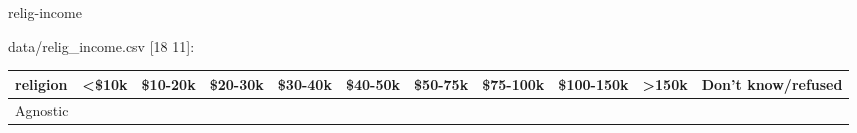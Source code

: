 \documentclass[]{article}
\newenvironment{Shaded}{\begin{snugshade}}{\end{snugshade}}
\newcommand{\NormalTok}[1]{#1}
\begin{document}
\begin{Shaded}
\begin{Highlighting}[]
\NormalTok{relig-income}
\end{Highlighting}
\end{Shaded}

data/relig\_income.csv {[}18 11{]}:

\begin{longtable}[]{@{}lllllllllll@{}}
\toprule
\begin{minipage}[b]{0.14\columnwidth}\raggedright\strut
religion\strut
\end{minipage} & \begin{minipage}[b]{0.04\columnwidth}\raggedright\strut
\textless{}\$10k\strut
\end{minipage} & \begin{minipage}[b]{0.05\columnwidth}\raggedright\strut
\$10-20k\strut
\end{minipage} & \begin{minipage}[b]{0.05\columnwidth}\raggedright\strut
\$20-30k\strut
\end{minipage} & \begin{minipage}[b]{0.05\columnwidth}\raggedright\strut
\$30-40k\strut
\end{minipage} & \begin{minipage}[b]{0.05\columnwidth}\raggedright\strut
\$40-50k\strut
\end{minipage} & \begin{minipage}[b]{0.05\columnwidth}\raggedright\strut
\$50-75k\strut
\end{minipage} & \begin{minipage}[b]{0.06\columnwidth}\raggedright\strut
\$75-100k\strut
\end{minipage} & \begin{minipage}[b]{0.06\columnwidth}\raggedright\strut
\$100-150k\strut
\end{minipage} & \begin{minipage}[b]{0.04\columnwidth}\raggedright\strut
\textgreater{}150k\strut
\end{minipage} & \begin{minipage}[b]{0.11\columnwidth}\raggedright\strut
Don't know/refused\strut
\end{minipage}\tabularnewline
\midrule
\endhead
\begin{minipage}[t]{0.14\columnwidth}\raggedright\strut
Agnostic\strut
\end{minipage} & \begin{minipage}[t]{0.04\columnwidth}\raggedright\strut

\end{minipage}
\end{longtable}
\end{document}
